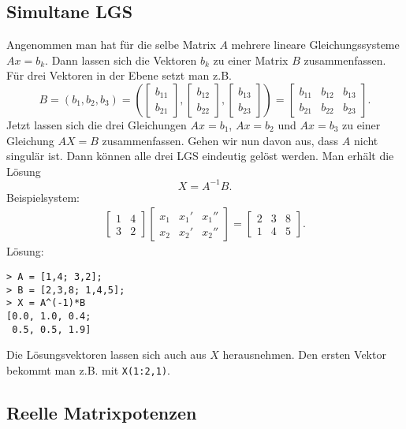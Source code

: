 \documentclass[a4paper,11pt,fleqn]{article}
\begin{document}
\subsection{Simultane LGS}

Angenommen man hat für die selbe Matrix \(A\) mehrere lineare
Gleichungssysteme \(Ax=b_k\). Dann lassen sich
die Vektoren \(b_k\) zu einer Matrix \(B\) zusammenfassen.
Für drei Vektoren in der Ebene setzt man z.B.
\[B=(b_1,b_2,b_3)
= (\begin{bmatrix}b_{11}\\ b_{21}\end{bmatrix},
\begin{bmatrix}b_{12}\\ b_{22}\end{bmatrix},
\begin{bmatrix}b_{13}\\ b_{23}\end{bmatrix})
= \begin{bmatrix}
b_{11} & b_{12} & b_{13}\\
b_{21} & b_{22} & b_{23}
\end{bmatrix}.\]
Jetzt lassen sich die drei Gleichungen \(Ax=b_1\), \(Ax=b_2\) und
\(Ax=b_3\) zu einer Gleichung \(AX=B\) zusammenfassen.
Gehen wir nun davon aus, dass \(A\) nicht singulär ist. Dann können
alle drei LGS eindeutig gelöst werden. Man erhält die Lösung
\[X = A^{-1}B.\]
Beispielsystem:
\begin{gather*}
\begin{bmatrix}
1 & 4\\
3 & 2
\end{bmatrix}
\begin{bmatrix}
x_1 & x_1' & x_1''\\
x_2 & x_2' & x_2''
\end{bmatrix}
= \begin{bmatrix}
2 & 3 & 8\\
1 & 4 & 5
\end{bmatrix}.
\end{gather*}
Lösung:
\begin{verbatim}
> A = [1,4; 3,2];
> B = [2,3,8; 1,4,5];
> X = A^(-1)*B
[0.0, 1.0, 0.4;
 0.5, 0.5, 1.9]
\end{verbatim}
Die Lösungsvektoren lassen sich auch aus \(X\) herausnehmen.
Den ersten Vektor bekommt man z.B. mit \texttt{X(1:2,1)}.


\subsection{Reelle Matrixpotenzen}
\end{document}

